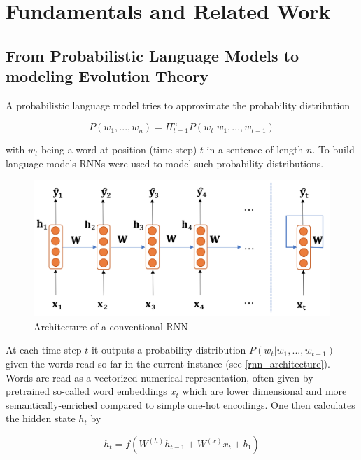 \section{Fundamentals and Related Work} \label{fundamentals}

\subsection{From Probabilistic Language Models to modeling Evolution Theory} \label{fundamentalsA}

A probabilistic language model tries to approximate the probability distribution 

\begin{equation}
	P(w_1, ..., w_n) = \Pi_{t=1}^{n} P(w_t | w_1, ..., w_{t-1})
\end{equation}

with $w_t$ being a word at position (time step) $t$ in a sentence of length $n$. To build language models \acp{RNN} were used to model such probability distributions. 

\begin{figure}[ht]
	\centering
	\includegraphics[width=1.0\linewidth]{figures/rnn_architecture.png}
	\caption{Architecture of a conventional \ac{RNN} \cite{Gertz2020}}
	\label{rnn_architecture}
\end{figure}

At each time step $t$ it outputs a probability distribution $P(w_t | w_1, ..., w_{t-1})$ given the words read so far in the current instance (see \autoref{rnn_architecture}). Words are read as a vectorized numerical representation, often given by pretrained so-called word embeddings $x_t$ which are lower dimensional and more semantically-enriched compared to simple one-hot encodings. One then calculates the hidden state $h_t$ by

\begin{equation}
	h_t = f(W^{(h)} h_{t-1} + W^{(x)} x_t + b_1)
\end{equation}


